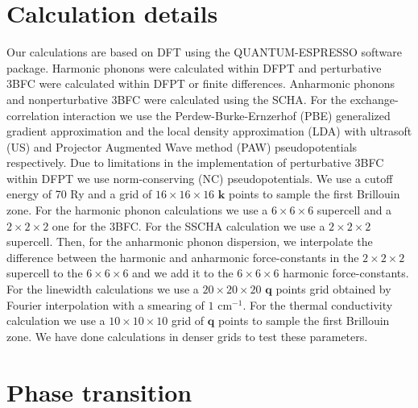 \section{Calculation details}

Our calculations are based on DFT using the QUANTUM-ESPRESSO\cite{giannozzi2009quantum} software package. Harmonic phonons were calculated within DFPT and perturbative 3BFC were calculated within DFPT or finite 
differences\cite{li2014shengbte}. Anharmonic phonons and nonperturbative 3BFC were calculated using the SCHA. For the exchange-correlation interaction we use the Perdew-Burke-Ernzerhof (PBE) generalized gradient 
approximation and the local density approximation (LDA) with ultrasoft (US) and Projector Augmented Wave method (PAW) pseudopotentials respectively. Due to limitations in the implementation of perturbative 3BFC 
within DFPT we use norm-conserving (NC) pseudopotentials. We use a cutoff energy of 70 Ry and a grid of $16\times16\times16$ $\boldsymbol{k}$ points to sample the first Brillouin zone. For the harmonic phonon calculations 
we use a $6\times6\times6$ supercell and a $2\times2\times2$ one for the 3BFC. For the SSCHA calculation we use a $2\times2\times2$ supercell. Then, for the anharmonic phonon dispersion, we interpolate the difference between the 
harmonic and anharmonic force-constants in the $2\times2\times2$ supercell to the $6\times6\times6$ and we add it to the $6\times6\times6$ harmonic force-constants. For the linewidth calculations we use a $20\times20\times20$ 
$\boldsymbol{q}$ points grid obtained by Fourier interpolation with a smearing of $1$ cm$^{-1}$. For the thermal conductivity calculation we use a $10\times10\times10$ grid of $\boldsymbol{q}$ points to sample the first 
Brillouin zone. We have done calculations in denser grids to test these parameters.

\section{Phase transition}

